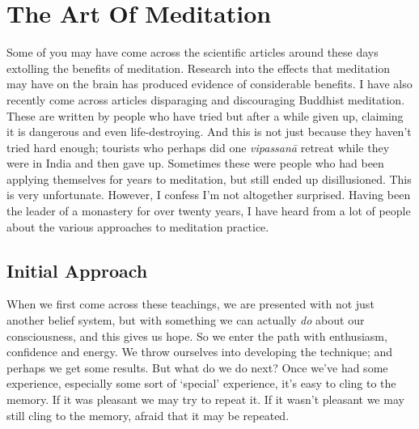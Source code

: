 
\chapter{The Art Of Meditation}


Some of you may have come across the scientific articles around these
days extolling the benefits of meditation. Research into the effects
that meditation may have on the brain has produced evidence of
considerable benefits. I have also recently come across articles
disparaging and discouraging Buddhist meditation. These are written by
people who have tried but after a while given up, claiming it is
dangerous and even life-destroying. And this is not just because they
haven’t tried hard enough; tourists who perhaps did one \emph{vipassanā}
retreat while they were in India and then gave up. Sometimes these were
people who had been applying themselves for years to meditation, but
still ended up disillusioned. This is very unfortunate. However, I
confess I’m not altogether surprised. Having been the leader of a
monastery for over twenty years, I have heard from a lot of people about
the various approaches to meditation practice.

\section{Initial Approach}

When we first come across these teachings, we are presented with not
just another belief system, but with something we can actually \emph{do}
about our consciousness, and this gives us hope. So we enter the path
with enthusiasm, confidence and energy. We throw ourselves into
developing the technique; and perhaps we get some results. But what do
we do next? Once we’ve had some experience, especially some sort of
‘special’ experience, it’s easy to cling to the memory. If it was
pleasant we may try to repeat it. If it wasn’t pleasant we may still
cling to the memory, afraid that it may be repeated.

